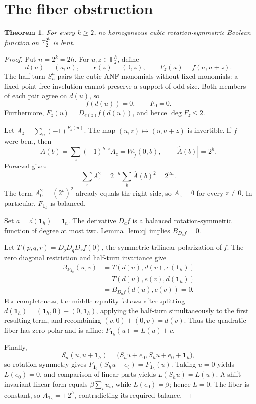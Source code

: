 \documentclass[11pt]{article}
\newtheorem{theorem}{Theorem}
\newcommand{\F}{\mathbb F_2}
\begin{document}
\section{The fiber obstruction}
\begin{theorem}\label{thm:main}
For every \(k\ge2\), no homogeneous cubic rotation-symmetric Boolean function on \(\F^{2^k}\) is bent.
\end{theorem}
\begin{proof}
Put \(n=2^k=2h\). For \(u,z\in\F^h\), define
\[
d(u)=(u,u),\qquad e(z)=(0,z),\qquad F_z(u)=f(u,u+z).
\]
The half-turn \(S_n^h\) pairs the cubic ANF monomials without fixed monomials: a fixed-point-free involution cannot preserve a support of odd size. Both members of each pair agree on \(d(u)\), so
\[
f(d(u))=0,\qquad F_0=0.
\]
Furthermore, \(F_z(u)=D_{e(z)}f(d(u))\), and hence \(\deg F_z\le2\).

Let \(A_z=\sum_u(-1)^{F_z(u)}\). The map \((u,z)\mapsto(u,u+z)\) is invertible. If \(f\) were bent, then
\[
\widehat A(b)=\sum_z(-1)^{b\cdot z}A_z=W_{\widetilde f}(0,b),
\qquad |\widehat A(b)|=2^h.
\]
Parseval gives
\[
\sum_z A_z^2=2^{-h}\sum_b\widehat A(b)^2=2^{2h}.
\]
The term \(A_0^2=(2^h)^2\) already equals the right side, so \(A_z=0\) for every \(z\ne0\). In particular, \(F_{\mathbf1_h}\) is balanced.

Set \(a=d(\mathbf1_h)=\mathbf1_n\). The derivative \(D_af\) is a balanced rotation-symmetric function of degree at most two. Lemma~\ref{lem:q} implies \(B_{D_af}=0\).

Let \(T(p,q,r)=D_pD_qD_rf(0)\), the symmetric trilinear polarization of \(f\). The zero diagonal restriction and half-turn invariance give
\begin{align*}
B_{F_{\mathbf1_h}}(u,v)
 &=T(d(u),d(v),e(\mathbf1_h))\\
 &=T(d(u),e(v),d(\mathbf1_h))\\
 &=B_{D_af}(d(u),e(v))=0.
\end{align*}
For completeness, the middle equality follows after splitting \(d(\mathbf1_h)=(\mathbf1_h,0)+(0,\mathbf1_h)\), applying the half-turn simultaneously to the first resulting term, and recombining \((v,0)+(0,v)=d(v)\). Thus the quadratic fiber has zero polar and is affine: \(F_{\mathbf1_h}(u)=L(u)+c\).

Finally,
\[
S_n(u,u+\mathbf1_h)=
\bigl(S_hu+e_0,S_hu+e_0+\mathbf1_h\bigr),
\]
so rotation symmetry gives \(F_{\mathbf1_h}(S_hu+e_0)=F_{\mathbf1_h}(u)\). Taking \(u=0\) yields \(L(e_0)=0\), and comparison of linear parts yields \(L(S_hu)=L(u)\). A shift-invariant linear form equals \(\beta\sum_i u_i\), while \(L(e_0)=\beta\); hence \(L=0\). The fiber is constant, so \(A_{\mathbf1_h}=\pm2^h\), contradicting its required balance.
\end{proof}
\end{document}
